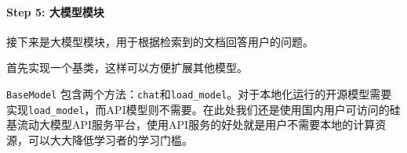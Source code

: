 \documentclass[12pt,a4paper]{book}
\begin{document}
\paragraph{Step 5:
大模型模块}\label{step-5-ux5927ux6a21ux578bux6a21ux5757}

接下来是大模型模块，用于根据检索到的文档回答用户的问题。

首先实现一个基类，这样可以方便扩展其他模型。

\begin{Shaded}
\begin{Highlighting}[]
     \NormalTok{(} \OperatorTok{=} \StringTok{\textquotesingle{}\textquotesingle{}}\NormalTok{) }\OperatorTok{{-}\textgreater{}} \NormalTok{:}
        \OperatorTok{=}

    \NormalTok{, history: List[}\NormalTok{], content: }\NormalTok{) }\OperatorTok{{-}\textgreater{}} \NormalTok{:}

    \NormalTok{):}
\end{Highlighting}
\end{Shaded}

\texttt{BaseModel}
包含两个方法：\texttt{chat}和\texttt{load\_model}。对于本地化运行的开源模型需要实现\texttt{load\_model}，而API模型则不需要。在此处我们还是使用国内用户可访问的硅基流动大模型API服务平台，使用API服务的好处就是用户不需要本地的计算资源，可以大大降低学习者的学习门槛。
\end{document}
